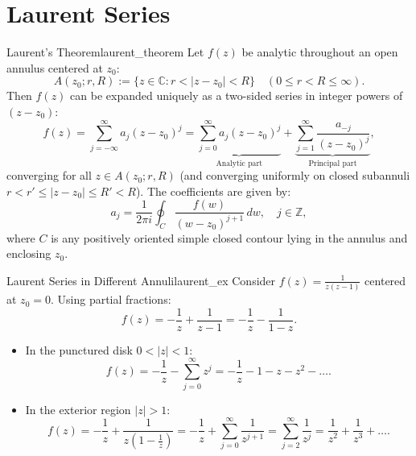 \section{Laurent Series}

\begin{theorem}{Laurent's Theorem}{laurent_theorem}
Let $f(z)$ be analytic throughout an open annulus centered at $z_0$:
\begin{equation}
A(z_0; r, R) := \{z \in \mathbb{C} : r < |z - z_0| < R\} \quad (0 \le r < R \le \infty).
\end{equation}
Then $f(z)$ can be expanded uniquely as a two-sided series in integer powers of $(z - z_0)$:
\begin{equation}
f(z) = \sum_{j=-\infty}^\infty a_j (z - z_0)^j = \underbrace{\sum_{j=0}^\infty a_j (z - z_0)^j}_{\text{Analytic part}} + \underbrace{\sum_{j=1}^\infty \frac{a_{-j}}{(z - z_0)^j}}_{\text{Principal part}},
\end{equation}
converging for all $z \in A(z_0; r, R)$ (and converging uniformly on closed subannuli $r < r' \le |z - z_0| \le R' < R$).
The coefficients are given by:
\begin{equation}
a_j = \frac{1}{2\pi i} \oint_C \frac{f(w)}{(w - z_0)^{j+1}}\, dw, \quad j \in \mathbb{Z},
\end{equation}
where $C$ is any positively oriented simple closed contour lying in the annulus and enclosing $z_0$.
\end{theorem}

\begin{example}{Laurent Series in Different Annuli}{laurent_ex}
Consider $f(z) = \frac{1}{z(z - 1)}$ centered at $z_0 = 0$. Using partial fractions:
\begin{equation}
f(z) = -\frac{1}{z} + \frac{1}{z - 1} = -\frac{1}{z} - \frac{1}{1 - z}.
\end{equation}
\begin{itemize}
    \item In the punctured disk $0 < |z| < 1$:
    \begin{equation}
    f(z) = -\frac{1}{z} - \sum_{j=0}^\infty z^j = -\frac{1}{z} - 1 - z - z^2 - \dots.
    \end{equation}
    \item In the exterior region $|z| > 1$:
    \begin{equation}
    f(z) = -\frac{1}{z} + \frac{1}{z\left(1 - \frac{1}{z}\right)} = -\frac{1}{z} + \sum_{j=0}^\infty \frac{1}{z^{j+1}} = \sum_{j=2}^\infty \frac{1}{z^j} = \frac{1}{z^2} + \frac{1}{z^3} + \dots.
    \end{equation}
\end{itemize}
\end{example}


